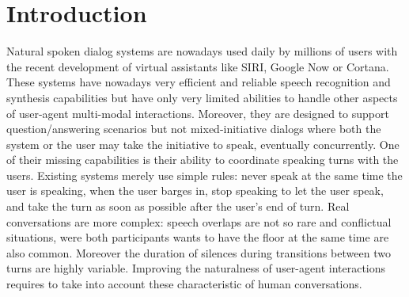 \section{Introduction}

Natural spoken dialog systems are nowadays used daily by millions of users with the recent development of virtual assistants like SIRI, Google Now or Cortana.
These systems have nowadays very efficient and reliable speech recognition and synthesis capabilities but have only very limited abilities to handle other aspects of user-agent multi-modal interactions.
Moreover, they are designed to support question/answering scenarios but not mixed-initiative dialogs where both the system or the user may take the initiative to speak, eventually concurrently. One of their missing capabilities is their ability to coordinate speaking turns with the users. Existing systems merely use simple rules: never speak at the same time the user is speaking, when the user barges in, stop speaking to let the user speak, and take the turn as soon as possible after the user's end of turn. Real conversations are more complex: speech overlaps are not so rare and conflictual situations, were both participants wants to have the floor at the same time are also common. Moreover the duration of silences during transitions between two turns are highly variable. 
Improving the naturalness of user-agent interactions requires to take into account these characteristic of human conversations.



